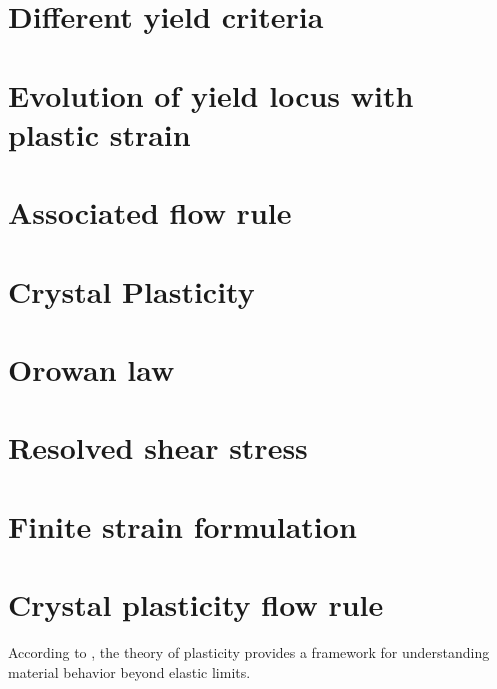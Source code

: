 \documentclass[12pt]{article}
\begin{document}
\section{Different yield criteria}
\section{Evolution of yield locus with plastic strain}
\section{Associated flow rule}

\section*{Crystal Plasticity}
\section{Orowan law}
\section{Resolved shear stress}
\section{Finite strain formulation}
\section{Crystal plasticity flow rule}

According to \cite{hill1950}, the theory of plasticity provides a framework for understanding material behavior beyond elastic limits.



\end{document}

